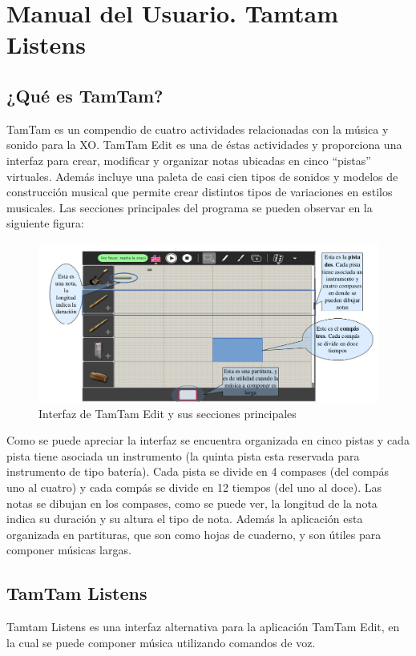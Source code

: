 \section{Manual del Usuario. Tamtam Listens}

\subsection{¿Qu\'e es TamTam?}

TamTam es un compendio de cuatro actividades relacionadas con la m\'usica y sonido para la XO.
TamTam Edit es una de \'estas actividades y proporciona una interfaz para crear, modificar y organizar
notas ubicadas en cinco ``pistas'' virtuales. Adem\'as incluye una paleta de casi cien tipos de sonidos y
modelos de construcci\'on musical que permite crear distintos tipos de variaciones en estilos musicales.
Las secciones principales del programa se pueden observar en la siguiente figura:


\begin{figure}[H] 
\centering
\includegraphics[width=1\textwidth]{./graphics/ui-tamtam.png}
\caption{Interfaz de TamTam Edit y sus secciones principales}
\label{figure:ui-tamtam-anexo}
\end{figure}

Como se puede apreciar la interfaz se encuentra organizada en cinco pistas y cada pista tiene asociada
un instrumento (la quinta pista esta reservada para instrumento de tipo bater\'ia). Cada pista se divide en
4 compases (del comp\'as uno al cuatro) y cada comp\'as se divide en 12 tiempos (del uno al doce). Las
notas se dibujan en los compases, como se puede ver, la longitud de la nota indica su duraci\'on y su
altura el tipo de nota.  Adem\'as la aplicaci\'on esta organizada en partituras, que son como hojas  de
cuaderno, y son \'utiles para componer m\'usicas largas.

\subsection{TamTam Listens}
Tamtam Listens es una interfaz alternativa para la aplicaci\'on TamTam Edit, en la cual se puede
componer m\'usica utilizando comandos de voz. 

